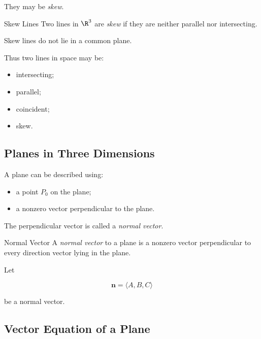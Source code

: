 They may be \emph{skew}.

\begin{definitionbox}{Skew Lines}
Two lines in \(\R^3\) are \emph{skew} if they are neither parallel nor
intersecting.
\end{definitionbox}

Skew lines do not lie in a common plane.

Thus two lines in space may be:

\begin{itemize}
    \item intersecting;
    \item parallel;
    \item coincident;
    \item skew.
\end{itemize}

\subsection{Planes in Three Dimensions}
\label{subsec:planes-vector-geometry}

A plane can be described using:

\begin{itemize}
    \item a point \(P_0\) on the plane;
    \item a nonzero vector perpendicular to the plane.
\end{itemize}

The perpendicular vector is called a \emph{normal vector}.

\begin{definitionbox}{Normal Vector}
A \emph{normal vector} to a plane is a nonzero vector perpendicular to every
direction vector lying in the plane.
\end{definitionbox}

Let

\[ \mathbf{n}=\langle A,B,C\rangle \]

be a normal vector.

\subsection{Vector Equation of a Plane}
\label{subsec:vector-equation-plane}

